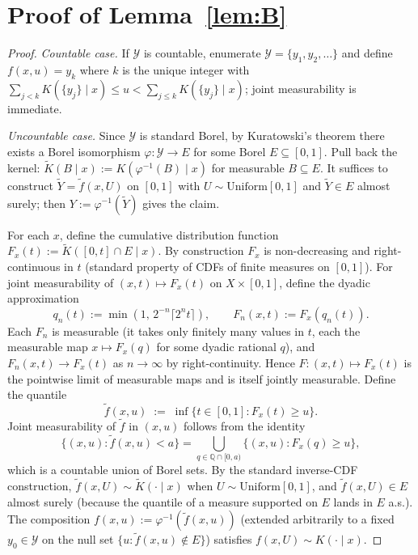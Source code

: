 \documentclass{article}
\theoremstyle{plain}
\theoremstyle{definition}
\theoremstyle{remark}
\newcommand{\Y}{\mathcal{Y}}
\begin{document}
\section{Proof of Lemma~\ref{lem:B}}\label{app:lem-B-proof}

\begin{proof}
\emph{Countable case.} If $\Y$ is countable, enumerate $\Y = \{y_1, y_2, \ldots\}$
and define $f(x, u) = y_k$ where $k$ is the unique integer with
$\sum_{j < k} K(\{y_j\} \mid x) \le u < \sum_{j \le k} K(\{y_j\} \mid x)$;
joint measurability is immediate.

\emph{Uncountable case.} Since $\Y$ is standard Borel, by Kuratowski's
theorem there exists a Borel isomorphism $\varphi : \Y \to E$ for some
Borel $E \subseteq [0, 1]$. Pull back the kernel:
$\widetilde K(B \mid x) := K(\varphi^{-1}(B) \mid x)$ for measurable
$B \subseteq E$. It suffices to construct $\widetilde Y = \widetilde f(x, U)$
on $[0, 1]$ with $U \sim \mathrm{Uniform}[0, 1]$ and
$\widetilde Y \in E$ almost surely; then $Y := \varphi^{-1}(\widetilde Y)$
gives the claim.

For each $x$, define the cumulative distribution function
$F_x(t) := \widetilde K([0, t] \cap E \mid x)$. By construction $F_x$ is
non-decreasing and right-continuous in $t$ (standard property of CDFs of
finite measures on $[0, 1]$). For joint measurability of
$(x, t) \mapsto F_x(t)$ on $X \times [0, 1]$, define the dyadic
approximation
\[
q_n(t) := \min(1,\, 2^{-n} \lceil 2^n t \rceil),
\qquad
F_n(x, t) := F_x(q_n(t)).
\]
Each $F_n$ is measurable (it takes only finitely many values in $t$, each
the measurable map $x \mapsto F_x(q)$ for some dyadic rational $q$), and
$F_n(x, t) \to F_x(t)$ as $n \to \infty$ by right-continuity. Hence
$F : (x, t) \mapsto F_x(t)$ is the pointwise limit of measurable maps and
is itself jointly measurable. Define the quantile
\[
\widetilde f(x, u) \;:=\; \inf\{ t \in [0, 1] : F_x(t) \ge u \}.
\]
Joint measurability of $\widetilde f$ in $(x, u)$ follows from the identity
\[
\{(x, u) : \widetilde f(x, u) < a\} = \bigcup_{q \in \mathbb{Q} \cap [0, a)} \{(x, u) : F_x(q) \ge u\},
\]
which is a countable union of Borel sets. By the standard inverse-CDF
construction, $\widetilde f(x, U) \sim \widetilde K(\cdot \mid x)$ when
$U \sim \mathrm{Uniform}[0, 1]$, and $\widetilde f(x, U) \in E$ almost surely
(because the quantile of a measure supported on $E$ lands in $E$ a.s.). The
composition $f(x, u) := \varphi^{-1}(\widetilde f(x, u))$ (extended
arbitrarily to a fixed $y_0 \in \Y$ on the null set $\{u : \widetilde f(x, u) \notin E\}$)
satisfies $f(x, U) \sim K(\cdot \mid x)$.
\end{proof}
\end{document}
